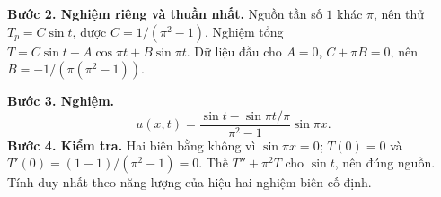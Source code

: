 \documentclass[10pt,a4paper]{article}
\begin{document}
\textbf{Bước 2. Nghiệm riêng và thuần nhất.} Nguồn tần số $1$ khác $\pi$, nên thử $T_p=C\sin t$, được $C=1/(\pi^2-1)$. Nghiệm tổng $T=C\sin t+A\cos\pi t+B\sin\pi t$. Dữ liệu đầu cho $A=0$, $C+\pi B=0$, nên $B=-1/(\pi(\pi^2-1))$.

\textbf{Bước 3. Nghiệm.}
\[u(x,t)=\frac{\sin t-\sin\pi t/\pi}{\pi^2-1}\sin\pi x.\]
\textbf{Bước 4. Kiểm tra.} Hai biên bằng không vì $\sin\pi x=0$; $T(0)=0$ và $T'(0)=(1-1)/(\pi^2-1)=0$. Thế $T''+\pi^2T$ cho $\sin t$, nên đúng nguồn. Tính duy nhất theo năng lượng của hiệu hai nghiệm biên cố định.
\end{document}
